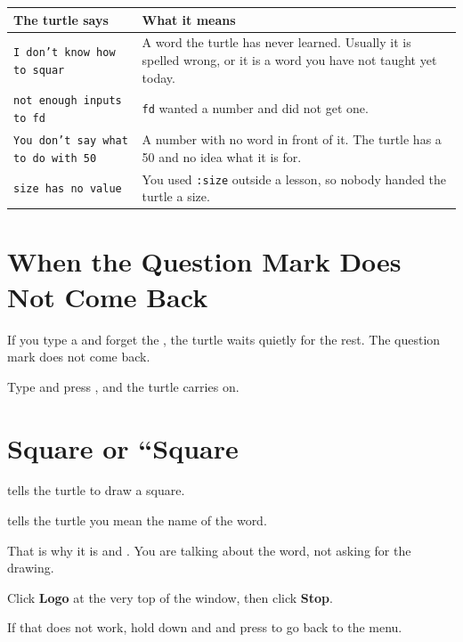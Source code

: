 \documentclass[12pt,oneside,paper=5.5in:8.5in,DIV=11,chapterprefix=false,headings=big]{scrbook}
\begin{document}
\begin{center}
\small
\begin{tabular}{>{\raggedright\arraybackslash}p{1.45in}>{\raggedright\arraybackslash}p{2.2in}}
\toprule
The turtle says & What it means \\
\midrule
\texttt{I don't know how to squar}
  & A word the turtle has never learned.
    Usually it is spelled wrong,
    or it is a word you have not taught yet today. \\[0.5em]
\texttt{not enough inputs to fd}
  & \texttt{fd} wanted a number and did not get one. \\[0.5em]
\texttt{You don't say what to do with 50}
  & A number with no word in front of it.
    The turtle has a 50 and no idea what it is for. \\[0.5em]
\texttt{size has no value}
  & You used \texttt{:size} outside a lesson,
    so nobody handed the turtle a size. \\
\bottomrule
\end{tabular}
\end{center}

\section{When the Question Mark Does Not Come Back}

If you type a \chip{[} and forget the \chip{]},
the turtle waits quietly for the rest.
The question mark does not come back.

Type \chip{]} and press ,
and the turtle carries on.

\section{Square or ``Square}

 tells the turtle to draw a square.

 tells the turtle
you mean the name of the word.

That is why it is 
and .
You are talking about the word,
not asking for the drawing.

\begin{heads}
Click \textbf{Logo} at the very top of the window,
then click \textbf{Stop}.

If that does not work, hold down  and 
and press  to go back to the menu.
\end{heads}
\end{document}

